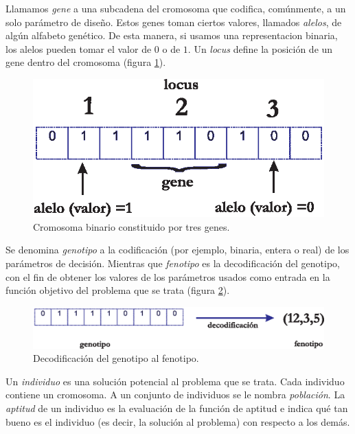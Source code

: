   Llamamos \textit{gene} a una subcadena del cromosoma que codifica, com\'unmente, a un solo par\'ametro de dise\~no. Estos genes toman 
  ciertos valores, llamados \textit{alelos}, de alg\'un alfabeto gen\'etico. De esta manera, si usamos una representacion binaria, 
  los alelos 
  pueden tomar el valor de $0$ o de $1$. Un \textit{locus} define la posici\'on de un gene dentro del cromosoma (figura \ref{fig:gene}).

  \begin{figure}[H]
	\centering
	\includegraphics[scale=0.70]{Cap2/1-17.eps}
	  \caption{Cromosoma binario constituido por tres genes.}
      \label{fig:gene}
      \end{figure}
  
  Se denomina \textit{genotipo} a la codificaci\'on (por ejemplo, binaria, entera o real) de los par\'ametros de decisi\'on. Mientras 
  que \textit{fenotipo} es la decodificaci\'on del genotipo, con el fin de obtener los valores de los par\'ametros usados como entrada 
  en la funci\'on objetivo del problema que se trata (figura \ref{fig:genotipo}).

  \begin{figure}[H]
	\centering
	\includegraphics[scale=0.70]{Cap2/1-18.eps}
	  \caption{Decodificaci\'on del genotipo al fenotipo.}
      \label{fig:genotipo}
      \end{figure}
  
  Un \textit{individuo} es una soluci\'on potencial al problema que se trata. Cada individuo contiene un cromosoma. A un conjunto de individuos 
  se le nombra \textit{poblaci\'on}. La \textit{aptitud} de un individuo es la evaluaci\'on de la funci\'on de aptitud e indica qu\'e
  tan bueno es el individuo (es decir, la soluci\'on al problema) con respecto a los dem\'as.

